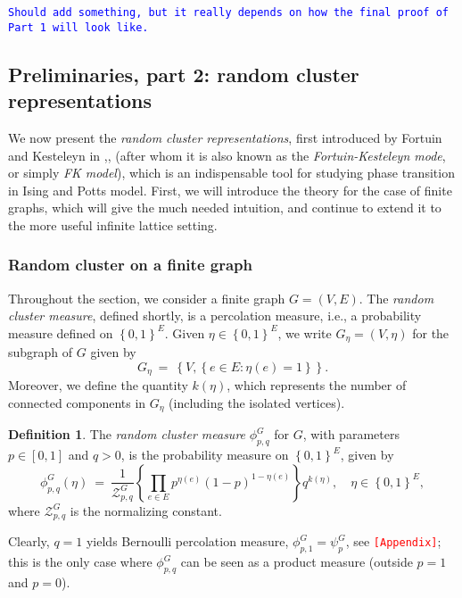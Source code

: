 \documentclass[12pt]{article}
\newcommand{\ZZ}{\mathcal{Z}}
\newcommand{\set}[1]{\left\{#1\right\}}
\newcommand{\1}{\mathbbm{1}}
\newcommand{\5}{\vspace{0.5cm}}
\theoremstyle{definition}
\newtheorem{df}[thm]{Definition}
\begin{document}
\textcolor{blue}{\texttt{Should add something, but it really depends on how the final proof of Part 1 will look like.}}


\subsection{Preliminaries, part 2: random cluster representations}

We now present the \textit{random cluster representations}, first introduced by Fortuin and Kesteleyn in \cite{FK},\cite{For1},\cite{For2} (after whom it is also known as the \textit{Fortuin-Kesteleyn mode}, or simply \textit{FK model}), which is an indispensable tool for studying phase transition in Ising and Potts model. First, we will introduce the theory for the case of finite graphs, which will give the much needed intuition, and continue to extend it to the more useful infinite lattice setting.


\subsubsection{Random cluster on a finite graph}

Throughout the section, we consider a finite graph $G=(V,E)$. The \textit{random cluster measure}, defined shortly, is a percolation measure, i.e., a probability measure defined on $\set{0,1}^E$. Given $\eta\in\set{0,1}^E$, we write $G_\eta=(V,\eta)$ for the subgraph of $G$ given by 
$$G_\eta ~=~ \set{V,\set{e\in E:\eta(e)=1}}.$$
Moreover, we define the quantity $k(\eta)$, which represents the number of connected components in $G_\eta$ (including the isolated vertices).

\begin{df}
The \textit{random cluster measure} $\phi_{p,q}^G$ for $G$, with parameters $p\in[0,1]$ and $q>0$, is the probability measure on $\set{0,1}^E$, given by
$$\phi_{p,q}^{G}(\eta) ~=~ \frac{1}{\ZZ_{p,q}^G}\set{\prod_{e\in E}p^{\eta(e)}(1-p)^{1-\eta(e)}}q^{k(\eta)}, \quad \eta\in\set{0,1}^E,$$
where $\ZZ_{p,q}^{G}$ is the normalizing constant.
\end{df} 

Clearly, $q=1$ yields Bernoulli percolation measure, $\phi_{p,1}^G=\psi_{p}^G$, see \textcolor{red}{\texttt{[Appendix]}}; this is the only case where $\phi_{p,q}^G$ can be seen as a product measure (outside $p=1$ and $p=0$). \\
\end{document}
